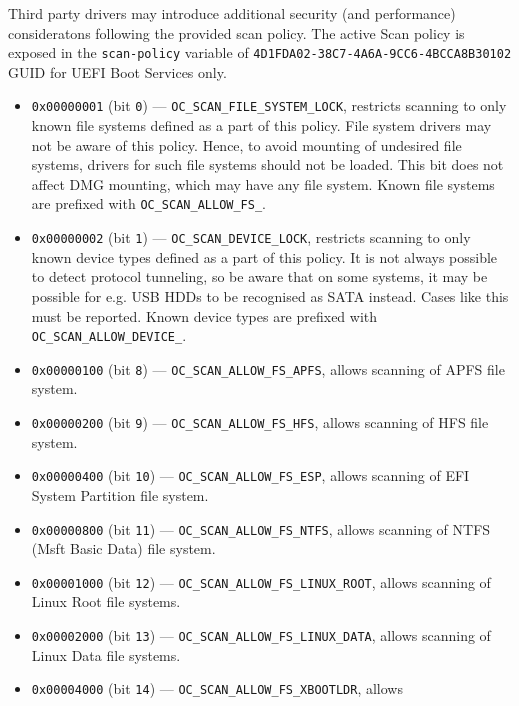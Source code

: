 \documentclass[]{article}
\providecommand{\tightlist}{%
  \setlength{\itemsep}{0pt}\setlength{\parskip}{0pt}}
\begin{document}
\begin{enumerate}
  Third party drivers may introduce additional security (and performance)
  consideratons following the provided scan policy. The active Scan policy is exposed
  in the \texttt{scan-policy} variable of \texttt{4D1FDA02-38C7-4A6A-9CC6-4BCCA8B30102}
  GUID for UEFI Boot Services only.

  \begin{itemize}
  \tightlist
    \item \texttt{0x00000001} (bit \texttt{0}) --- \texttt{OC\_SCAN\_FILE\_SYSTEM\_LOCK}, restricts
    scanning to only known file systems defined as a part of this policy. File system
    drivers may not be aware of this policy. Hence, to avoid mounting of undesired file
    systems, drivers for such file systems should not be loaded. This bit does not affect DMG mounting,
    which may have any file system. Known file systems are prefixed with
    \texttt{OC\_SCAN\_ALLOW\_FS\_}.
    \item \texttt{0x00000002} (bit \texttt{1}) --- \texttt{OC\_SCAN\_DEVICE\_LOCK}, restricts scanning
    to only known device types defined as a part of this policy. It is not always possible
    to detect protocol tunneling, so be aware that on some systems, it may be possible for
    e.g. USB HDDs to be recognised as SATA instead. Cases like this must be reported. Known device
    types are prefixed with \texttt{OC\_SCAN\_ALLOW\_DEVICE\_}.
    \item \texttt{0x00000100} (bit \texttt{8}) --- \texttt{OC\_SCAN\_ALLOW\_FS\_APFS}, allows scanning
    of APFS file system.
    \item \texttt{0x00000200} (bit \texttt{9}) --- \texttt{OC\_SCAN\_ALLOW\_FS\_HFS}, allows scanning
    of HFS file system.
    \item \texttt{0x00000400} (bit \texttt{10}) --- \texttt{OC\_SCAN\_ALLOW\_FS\_ESP}, allows scanning
    of EFI System Partition file system.
    \item \texttt{0x00000800} (bit \texttt{11}) --- \texttt{OC\_SCAN\_ALLOW\_FS\_NTFS}, allows scanning
    of NTFS (Msft Basic Data) file system.
    \item \texttt{0x00001000} (bit \texttt{12}) --- \texttt{OC\_SCAN\_ALLOW\_FS\_LINUX\_ROOT}, allows
    scanning of Linux Root file systems.
    \item \texttt{0x00002000} (bit \texttt{13}) --- \texttt{OC\_SCAN\_ALLOW\_FS\_LINUX\_DATA}, allows
    scanning of Linux Data file systems.
    \item \texttt{0x00004000} (bit \texttt{14}) --- \texttt{OC\_SCAN\_ALLOW\_FS\_XBOOTLDR}, allows

\end{itemize}
\end{enumerate}
\end{document}
